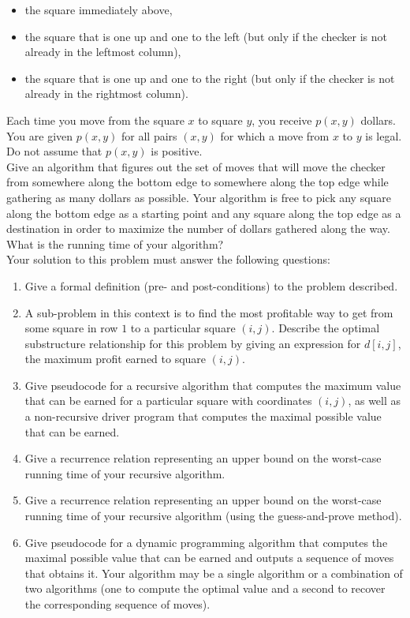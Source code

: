 \documentclass{assignment}
\begin{document}
\begin{problemlist}
\begin{problem}
\begin{itemize}
\item the square immediately above,
\item the square that is one up and one to the left (but only if the checker is not already in the leftmost column),
\item the square that is one up and one to the right (but only if the checker is not already in the rightmost column).
\end{itemize}
Each time you move from the square $x$ to square $y$, you receive $p(x,y)$ dollars. You are given $p(x,y)$ for all pairs $(x,y)$ for which a move from $x$ to $y$ is legal. Do not assume that $p(x,y)$ is positive.\\
Give an algorithm that figures out the set of moves that will move the checker from somewhere along the bottom edge to somewhere along the top edge while gathering as many dollars as possible. Your algorithm is free to pick any square along the bottom edge as a starting point and any square along the top edge as a destination in order to maximize the number of dollars gathered along the way. What is the running time of your algorithm?\\
Your solution to this problem must answer the following questions:
\begin{enumerate}
\item Give a formal definition (pre- and post-conditions) to the problem described.
\item A sub-problem in this context is to find the most profitable way to get from some square in row $1$ to a particular square $(i,j)$. Describe the optimal substructure relationship for this problem by giving an expression for $d[i,j]$, the maximum profit earned to square $(i,j)$.
\item Give pseudocode for a recursive algorithm that computes the maximum value that can be earned for a particular square with coordinates $(i,j)$, as well as a non-recursive driver program that computes the maximal possible value that can be earned.
\item Give a recurrence relation representing an upper bound on the worst-case running time of your recursive algorithm.
\item Give a recurrence relation representing an upper bound on the worst-case running time of your recursive algorithm (using the guess-and-prove method).
\item Give pseudocode for a dynamic programming algorithm that computes the maximal possible value that can be earned and outputs a sequence of moves that obtains it. Your algorithm may be a single algorithm or a combination of two algorithms (one to compute the optimal value and a second to recover the corresponding sequence of moves).

\end{enumerate}
\end{problem}
\end{problemlist}
\end{document}
